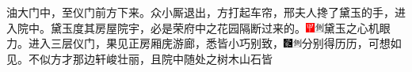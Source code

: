油大门中，至仪门前方下来。众小厮退出，方打起车帘，邢夫人搀了黛玉的手，进入院中。黛玉度其房屋院宇，必是荣府中之花园隔断过来的。{\includegraphics[width=3mm]{../Images/00002}\includegraphics[width=3mm]{../Images/00011}\footnotesize \kaishu 黛玉之心机眼力。}进入三层仪门，果见正房厢庑游廊，悉皆小巧别致，{\includegraphics[width=3mm]{../Images/00006}\includegraphics[width=3mm]{../Images/00011}\footnotesize \kaishu 分别得历历，可想如见。}不似方才那边轩峻壮丽，且院中随处之树木山石皆